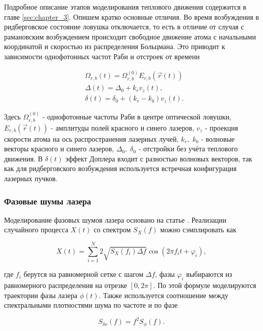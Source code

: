 Подробное описание этапов моделирования теплового движения содержится в главе \ref{sec:chapter_3}. Опишем кратко основные отличия. Во время возбуждения в ридберговское состояние ловушка отключается, то есть в отличие от случая с рамановским возбуждением происходит свободное движение атома с начальными координатой и скоростью из распределения Больцмана. Это приводит к зависимости однофотонных частот Раби и отстроек от времени

\begin{equation}
	\begin{aligned}
		& \Omega_{r,b}(t) = \Omega_{r,b}^{(0)}E_{r,b}(\vec{r}(t)) \\
		& \Delta(t) = \Delta_0 + k_r v_z(t), \\
		& \delta(t) = \delta_0 + (k_r - k_b)v_z(t).
	\end{aligned}
\end{equation}

Здесь $\Omega_{r,b}^{(0)}$ - однофотонные частоты Раби в центре оптической ловушки, $E_{r,b}(\vec{r}(t))$ - амплитуды полей красного и синего лазеров, $v_z$ - проекция скорости атома на ось распространения лазерных лучей, $k_r, \; k_b$ - волновые векторы красного и синего лазеров, $\Delta_0, \; \delta_0$ - отстройки без учёта теплового движения. В $\delta(t)$ эффект Доплера входит с разностью волновых векторов, так как для ридберговского возбуждения используется встречная конфигурация лазерных пучков. 


\subsubsection{Фазовые шумы лазера}

Моделирование фазовых шумов лазера основано на статье \cite{Saffman_Noise}. Реализации случайного процесса $X(t)$ со спектром $S_X(f)$ можно сэмплировать как 

\begin{equation}
	X(t) = \sum_{i=1}^{N}2\sqrt{S_X(f_i)\Delta f}\cos\left(2\pi f_i t + \varphi_i\right), 
	\label{eq:phase_noise}
\end{equation}

где $f_i$ берутся на равномерной сетке с шагом $\Delta f$, фазы $\varphi_i$ выбираются из равномерного распределения на отрезке $[0, 2\pi]$. По этой формуле моделируются траектории фазы лазера $\phi(t)$. Также используется соотношение между спектральными плотностями шума по частоте и по фазе

\begin{equation}
	S_{\delta \nu}(f) = f^2 S_{\phi}(f).
\end{equation}


